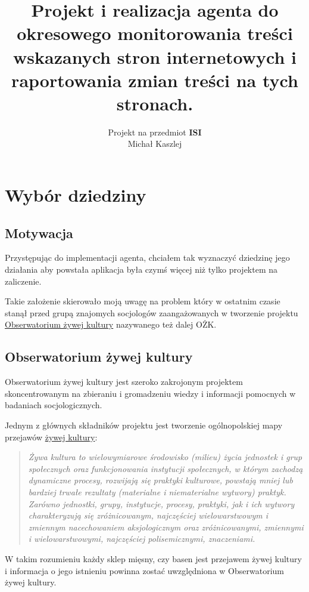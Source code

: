 \documentclass[a4 122pt]{article}
\title{Projekt i realizacja agenta do okresowego monitorowania treści wskazanych stron internetowych i raportowania zmian treści na tych stronach.}
\author{Projekt na przedmiot \textbf{ISI}\\Michał Kaszlej}
\begin{document}
\maketitle

	\section{Wybór dziedziny}

		\subsection{Motywacja}
		
			Przystępując do implementacji agenta, chciałem tak wyznaczyć dziedzinę jego działania aby powstała aplikacja była czymś więcej niż tylko projektem na zaliczenie.
			
			Takie założenie skierowało moją uwagę na problem który w ostatnim czasie stanął przed grupą znajomych socjologów zaangażowanych w tworzenie projektu 
			\href{http://ozkultura.pl}{Obserwatorium żywej kultury} nazywanego też dalej OŻK.

		\subsection{Obserwatorium żywej kultury}
		
			Obserwatorium żywej kultury jest szeroko zakrojonym projektem skoncentrowanym na zbieraniu i gromadzeniu wiedzy i informacji pomocnych w badaniach socjologicznych.
			
			Jednym z głównych składników projektu jest tworzenie ogólnopolskiej mapy przejawów \href{http://ozkultura.pl/node/111}{żywej kultury}:
			
			\begin{quote}
				\textit{Żywa kultura to wielowymiarowe środowisko (milieu) życia jednostek i grup społecznych oraz funkcjonowania instytucji społecznych, w którym zachodzą dynamiczne procesy, rozwijają się praktyki kulturowe, powstają  mniej lub bardziej trwałe rezultaty (materialne i niematerialne wytwory) praktyk. Zarówno jednostki, grupy, instytucje, procesy, praktyki, jak i ich wytwory charakteryzują się zróżnicowanym, najczęściej wielowarstwowym i zmiennym  nacechowaniem aksjologicznym oraz zróżnicowanymi, zmiennymi i wielowarstwowymi, najczęściej polisemicznymi, znaczeniami.}
			\end{quote}
			
			W takim rozumieniu każdy sklep mięsny, czy basen jest przejawem żywej kultury i informacja o jego istnieniu powinna zostać uwzględniona w Obserwatorium żywej kultury.
\end{document}
